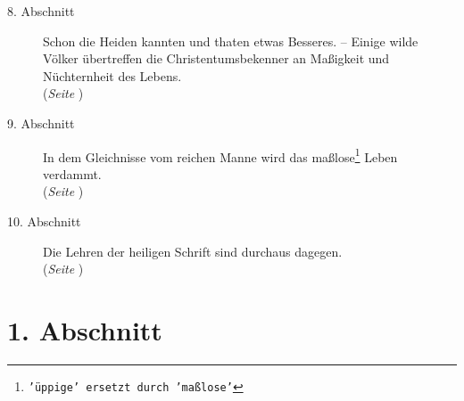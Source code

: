\begin{description}
\item[8. Abschnitt] Schon die Heiden kannten und thaten etwas Besseres. --
Einige wilde Völker übertreffen die Christentumsbekenner an Maßigkeit und
Nüchternheit des Lebens.
\\(\textit{Seite \pageref{kap14_ab8}})
\item[9. Abschnitt] In dem Gleichnisse vom reichen Manne wird das maßlose\footnote{\texttt{'üppige' ersetzt durch 'maßlose'}} Leben
verdammt.
\\(\textit{Seite \pageref{kap14_ab9}})
\item[10. Abschnitt] Die Lehren der heiligen Schrift sind durchaus dagegen.
\\(\textit{Seite \pageref{kap14_ab10}})
\end{description}
\normalsize

\section{1. Abschnitt} \label{kap14_ab1}

